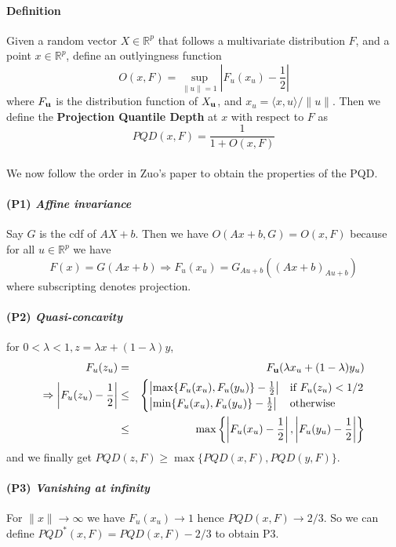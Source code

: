 \documentclass{article}
\begin{document}
\paragraph{Definition}
Given a random vector $X\in \mathbb{R}^p$ that follows a multivariate distribution $F$, and a point $x\in\mathbb{R}^p$, define an outlyingness function
$$ O(x,F) = \sup_{\|u\|=1} \left\vert F_u(x_u)-\frac{1}{2}\right\vert $$
where $F_{\bf{u}}$ is the distribution function of $X_{\bf{u}}$, and $x_u=\langle x,u\rangle/\|u\| $. Then we define the \textbf{Projection Quantile Depth} at $x$ with respect to $F$ as
$$ PQD(x,F) = \frac{1}{1+O(x,F)} $$

\paragraph{}We now follow the order in Zuo's paper to obtain the properties of the PQD.

\paragraph{(P1) \textit{Affine invariance}} Say $G$ is the cdf of $AX+b$. Then we have $O(Ax+b,G)=O(x,F)$ because for all $u\in\mathbb{R}^p$ we have
$$ F(x)= G(Ax+b) \Rightarrow F_u(x_u) = G_{Au+b}\left((Ax+b)_{Au+b}\right)$$
where subscripting denotes projection.

\paragraph{(P2) \textit{Quasi-concavity}} for $0<\lambda<1, z=\lambda x+(1-\lambda)y$,
\begin{eqnarray*}
F_u(z_u) &=& F_{\bf{u}} (\lambda x_u+(1-\lambda)y_u)\\
\Rightarrow \left\vert F_u(z_u)-\frac{1}{2}\right\vert &\leq &
\begin{cases}
\left\vert \max\{F_u(x_u),F_u(y_u)\}-\frac{1}{2}\right\vert & \mbox{if } F_u(z_u)<1/2\\
\left\vert \min\{F_u(x_u),F_u(y_u)\}-\frac{1}{2}\right\vert & \mbox{otherwise}
\end{cases}\\
&\leq & \max\left\lbrace \left\vert F_u(x_u)-\frac{1}{2}\right\vert, \left\vert F_u(y_u)-\frac{1}{2}\right\vert \right\rbrace
\end{eqnarray*}
and we finally get $PQD(z,F)\geq\max\{PQD(x,F),PQD(y,F)\}$.

\paragraph{(P3) \textit{Vanishing at infinity}}For $\|x\|\rightarrow\infty$ we have $F_u(x_u)\rightarrow 1$ hence $PQD(x,F)\rightarrow 2/3$. So we can define $PQD^*(x,F)=PQD(x,F)-2/3$ to obtain P3.
\end{document}
